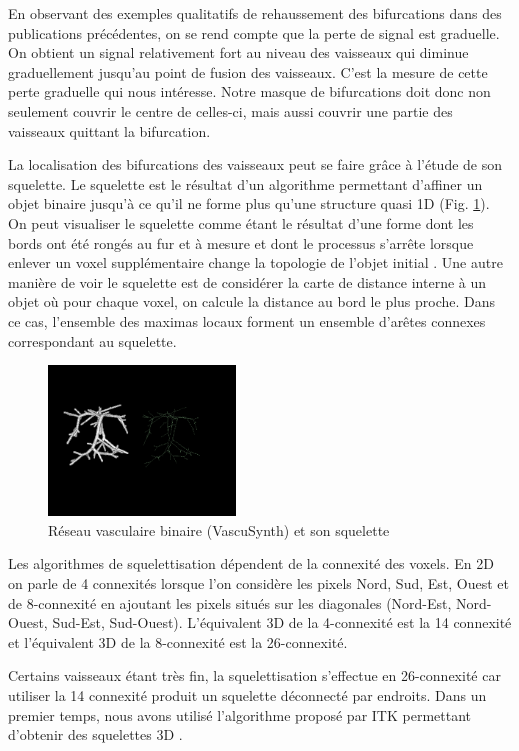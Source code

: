 En observant des exemples qualitatifs de rehaussement des bifurcations dans des publications précédentes, on se rend compte que la perte de signal est graduelle. On obtient un signal relativement fort au niveau des vaisseaux qui diminue graduellement jusqu'au point de fusion des vaisseaux. C'est la mesure de cette perte graduelle qui nous intéresse. Notre masque de bifurcations doit donc non seulement couvrir le centre de celles-ci, mais aussi couvrir une partie des vaisseaux quittant la bifurcation.

La localisation des bifurcations des vaisseaux peut se faire grâce à l'étude de son squelette. Le squelette est le résultat d'un algorithme permettant d'affiner un objet binaire jusqu'à ce qu'il ne forme plus qu'une structure quasi 1D (Fig. \ref{fig:vascu_skeleton}). On peut visualiser le squelette comme étant le résultat d'une forme dont les bords ont été rongés au fur et à mesure et dont le processus s'arrête lorsque enlever un voxel supplémentaire change la topologie de l'objet initial \cite{Lee1004_3D_skeleton}. Une autre manière de voir le squelette est de considérer la carte de distance interne à un objet où pour chaque voxel, on calcule la distance au bord le plus proche. Dans ce cas, l'ensemble des maximas locaux forment un ensemble d'arêtes connexes correspondant au squelette.

\begin{figure}[h]
  \centering
  \includegraphics[height=4cm]{Images/vascu_skeleton.png}
  \caption{Réseau vasculaire binaire (VascuSynth) et son squelette}
  \label{fig:vascu_skeleton}
\end{figure}

Les algorithmes de squelettisation dépendent de la connexité des voxels. En 2D on parle de 4 connexités lorsque l'on considère les pixels Nord, Sud, Est, Ouest et de 8-connexité en ajoutant les pixels situés sur les diagonales (Nord-Est, Nord-Ouest, Sud-Est, Sud-Ouest). L'équivalent 3D de la 4-connexité est la 14 connexité et l'équivalent 3D de la 8-connexité est la 26-connexité.

Certains vaisseaux étant très fin, la squelettisation s'effectue en 26-connexité car utiliser la 14 connexité produit un squelette déconnecté par endroits. Dans un premier temps, nous avons utilisé l'algorithme proposé par ITK permettant d'obtenir des squelettes 3D \cite{Homann2007_implementation_thinning}.

